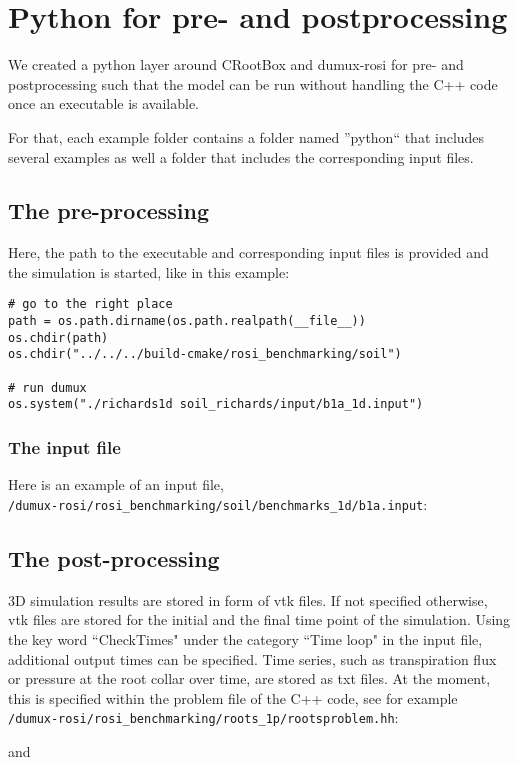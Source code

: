 \chapter*{Python for pre- and postprocessing}
We created a python layer around CRootBox and dumux-rosi for pre- and postprocessing such that the model can be run without handling the C++ code once an executable is available. 

For that, each example folder contains a folder named ''python`` that includes several examples as well a folder that includes the corresponding input files. 

\section*{The pre-processing}
Here, the path to the executable and corresponding input files is provided and the simulation is started, like in this example: 
\begin{lstlisting}
# go to the right place
path = os.path.dirname(os.path.realpath(__file__))
os.chdir(path)
os.chdir("../../../build-cmake/rosi_benchmarking/soil")

# run dumux
os.system("./richards1d soil_richards/input/b1a_1d.input")
\end{lstlisting}

\subsection*{The input file}
Here is an example of an input file,\\
\verb+/dumux-rosi/rosi_benchmarking/soil/benchmarks_1d/b1a.input+:
	\\


\section*{The post-processing}
3D simulation results are stored in form of vtk files. If not specified otherwise, vtk files are stored for the initial and the final time point of the simulation. Using the key word ``CheckTimes" under the category ``Time loop" in the input file, additional output times can be specified. Time series, such as transpiration flux or pressure at the root collar over time, are stored as txt files. At the moment, this is specified within the problem file of the C++ code, see for example\\
\verb+/dumux-rosi/rosi_benchmarking/roots_1p/rootsproblem.hh+:
	 
and
	  

